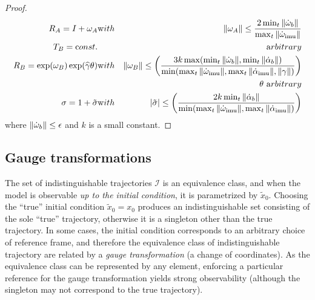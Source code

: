 \begin{proof}
\begin{eqnarray}
R_A = I + \omega_A  & {\mathrm with} & \| \omega_A \| \le \frac{2 \min_t \| \dot {\omega}_b \|}{\max_t \| \dot {\omega}_\mathrm{imu}  \|}  \\
T_B = {\mathrm const.} & & {\mathrm arbitrary}  \\
R_B = \exp(\omega_B)\exp(\widehat \gamma \theta)  & {\mathrm with} & \| \omega_B \| \le \left(\frac{3k\max(\min_t \|\dot {\omega}_b\|, \min_t \|\dot \alpha_b\| )}{\min(\max_t \| \dot {\omega}_\mathrm{imu}  \|, \max_t \| \dot \alpha_\mathrm{imu}  \|, \| \gamma \|)}\right) \\
& &  \theta \ {\mathrm arbitrary} \\
\sigma = 1 + \tilde \sigma  & {\mathrm with} & | \tilde \sigma | \le \left(\frac{2k\min_t \| \dot \alpha_b \|}{\min(\max_t \| \dot {\omega}_\mathrm{imu}  \|, \max_t \| \dot \alpha_\mathrm{imu}  \|)}\right)
\end{eqnarray}
where $\| \dot {\omega}_b \| \le \epsilon$ and $k$ is a small constant.
\fi
\end{proof}


\subsection{Gauge transformations}

The set of indistinguishable trajectories $\mathcal I$ is an equivalence class, and when the model is observable {\em up to the initial condition}, it is parametrized by $\tilde x_0$. 
Choosing the ``true'' initial condition $\tilde x_0 = x_0$ produces an indistinguishable set consisting of the sole ``true'' trajectory, otherwise it is a singleton other than the true trajectory. 
In some cases, the initial condition corresponds to an arbitrary choice of reference frame, and therefore the equivalence class of indistinguishable trajectory are related by a {\em gauge transformation} (a change of coordinates). 
As the equivalence class can be represented by any element, enforcing a particular reference for the gauge transformation yields strong observability (although the singleton may not correspond to the true trajectory). 


